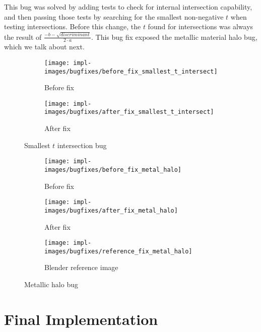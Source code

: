This bug was solved by adding tests to check for internal intersection capability, and then passing those tests by searching for the smallest non-negative $t$ when testing intersections.
Before this change, the $t$ found for intersections was always the result of $\frac{-b - \sqrt{discriminant}}{2 \cdot a}$.
This bug fix exposed the metallic material halo bug, which we talk about next.

\vspace{0.3em}
\begin{figure}[htb]
  \centering
  \begin{subfigure}[htb]{0.45\textwidth}
    \texttt{[image: impl-images/bugfixes/before\_fix\_smallest\_t\_intersect]}
    \caption{Before fix}
    \label{fig:rayterm-cpu_t_intersection_before}
  \end{subfigure}
  \begin{subfigure}[htb]{0.45\textwidth}
    \texttt{[image: impl-images/bugfixes/after\_fix\_smallest\_t\_intersect]}
    \caption{After fix}
    \label{fig:rayterm-cpu_t_intersection_after}
  \end{subfigure}
  \caption{Smallest $t$ intersection bug}
  \label{fig:rayterm-cpu_t_intersection_bug}
\end{figure}

\vspace{0.3em}
\begin{figure}[htb]
  \centering
  \begin{subfigure}[htb]{0.45\textwidth}
    \texttt{[image: impl-images/bugfixes/before\_fix\_metal\_halo]}
    \caption{Before fix}
    \label{fig:rayterm-cpu_halo_before}
  \end{subfigure}
  \begin{subfigure}[htb]{0.45\textwidth}
    \texttt{[image: impl-images/bugfixes/after\_fix\_metal\_halo]}
    \caption{After fix}
    \label{fig:rayterm-cpu_halo_after}
  \end{subfigure}
  \begin{subfigure}[htb]{0.65\textwidth}
    \texttt{[image: impl-images/bugfixes/reference\_fix\_metal\_halo]}
    \caption{Blender reference image}
    \label{fig:rayterm-cpu_halo_reference}
  \end{subfigure}
  \caption{Metallic halo bug}
  \label{fig:rayterm-cpu_halo_bug}
\end{figure}

\section{Final Implementation}\label{ch:implementation:final}

